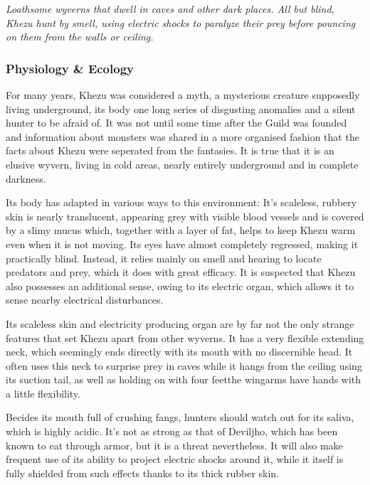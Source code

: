 \textit{Loathsome wyverns that dwell in caves and other dark places. All but blind, Khezu hunt by smell, using electric shocks to paralyze their prey before pouncing on them from the walls or ceiling.}
\subsubsection{Physiology \& Ecology}
For many years, Khezu was considered a myth, a mysterious creature supposedly living underground, its body one long series of disgusting anomalies and a silent hunter to be afraid of. It was not until some time after the Guild was founded and information about monsters was shared in a more organised fashion that the facts about Khezu were seperated from the fantasies. It is true that it is an elusive wyvern, living in cold areas, nearly entirely underground and in complete darkness.

Its body has adapted in various ways to this environment: It's scaleless, rubbery skin is nearly translucent, appearing grey with visible blood vessels and is covered by a slimy mucus which, together with a layer of fat, helps to keep Khezu warm even when it is not moving. Its eyes have almost completely regressed, making it practically blind. Instead, it relies mainly on smell and hearing to locate predators and prey, which it does with great efficacy. It is suspected that Khezu also possesses an additional sense, owing to its electric organ, which allows it to sense nearby electrical disturbances.

Its scaleless skin and electricity producing organ are by far not the only strange features that set Khezu apart from other wyverns. It has a very flexible extending neck, which seemingly ends directly with its mouth with no discernible head. It often uses this neck to surprise prey in caves while it hangs from the ceiling using its suction tail, as well as holding on with four feet\hbNone the wingarms have hands with a little flexibility.

Becides its mouth full of crushing fangs, hunters should watch out for its saliva, which is highly acidic. It's not as strong as that of Deviljho, which has been known to eat through armor, but it is a threat nevertheless. It will also make frequent use of its ability to project electric shocks around it, while it itself is fully shielded from such effects thanks to its thick rubber skin.

